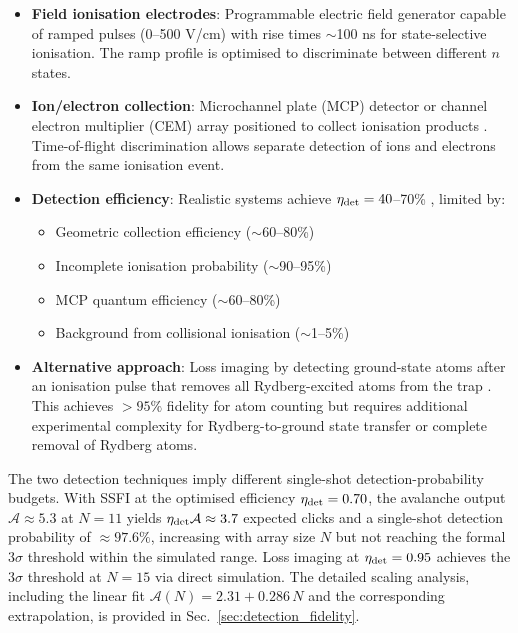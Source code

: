 \begin{itemize}
    \item \textbf{Field ionisation electrodes}: Programmable electric field generator capable of ramped pulses (0--500 V/cm) with rise times $\sim$100 ns for state-selective ionisation. The ramp profile is optimised to discriminate between different $n$ states.

    \item \textbf{Ion/electron collection}: Microchannel plate (MCP) detector or channel electron multiplier (CEM) array positioned to collect ionisation products \cite{Andersen2013, Seery2024}. Time-of-flight discrimination allows separate detection of ions and electrons from the same ionisation event.

    \item \textbf{Detection efficiency}: Realistic systems achieve $\eta_{\rm det} = 40$--70\% \cite{Ryabtsev2007, Andersen2013}, limited by:
    \begin{itemize}
        \item Geometric collection efficiency ($\sim$60--80\%)
        \item Incomplete ionisation probability ($\sim$90--95\%)
        \item MCP quantum efficiency ($\sim$60--80\%)
        \item Background from collisional ionisation ($\sim$1--5\%)
    \end{itemize}

    \item \textbf{Alternative approach}: Loss imaging by detecting ground-state atoms after an ionisation pulse that removes all Rydberg-excited atoms from the trap \cite{Endres2016, Bluvstein2024}. This achieves $>95\%$ fidelity for atom counting but requires additional experimental complexity for Rydberg-to-ground state transfer or complete removal of Rydberg atoms.
\end{itemize}

The two detection techniques imply different single-shot detection-probability budgets. With SSFI at the optimised efficiency $\eta_{\rm det} = 0.70$, the avalanche output $\mathcal{A} \approx 5.3$ at $N = 11$ yields $\eta_{\rm det}\mathcal{A} \approx 3.7$ expected clicks and a single-shot detection probability of $\approx 97.6\%$, increasing with array size $N$ but not reaching the formal $3\sigma$ threshold within the simulated range. Loss imaging at $\eta_{\rm det} = 0.95$ achieves the $3\sigma$ threshold at $N = 15$ via direct simulation. The detailed scaling analysis, including the linear fit $\mathcal{A}(N) = 2.31 + 0.286\,N$ and the corresponding extrapolation, is provided in Sec.~\ref{sec:detection_fidelity}.

